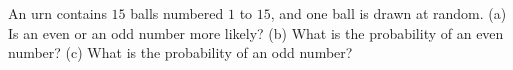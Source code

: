 An urn contains $15$ balls numbered $1$ to $15$, and one ball is drawn at random. (a) Is an even or an odd number more likely? (b) What is the probability of an even number? (c) What is the probability of an odd number?
